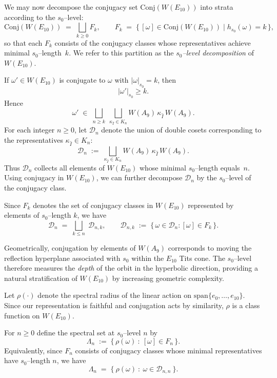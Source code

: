 \documentclass[11pt]{amsart}
\numberwithin{equation}{section}
\newcommand{\conW}{\mathrm{Conj}(W(E_{10}))}
\begin{document}
 \vspace{1ex}
We may now decompose the conjugacy set $\conW$ into strata according to
the $s_0$--level:
\[
\conW \;=\; \bigsqcup_{k\ge 0} F_k,
\qquad
F_k \;=\; \{\, [\omega] \in \conW \mid h_{s_0}(\omega)=k \,\},
\]
so that each $F_k$ consists of the conjugacy classes whose representatives
achieve minimal $s_0$--length~$k$.
We refer to this partition as the \emph{$s_0$--level decomposition} of
$W(E_{10})$.

\medskip
If $\omega'\in W(E_{10})$ is conjugate to $\omega$ with 
$|\omega|_{s_0}=k$, then
\[
|\omega'|_{s_0}\ge k.
\]
Hence
\[
\omega' \;\in\;
\bigsqcup_{n\ge k}\;
\bigsqcup_{\kappa_{\widehat I}\in K_n}
W(A_9)\,\kappa_{\widehat I}\,W(A_9).
\]
For each integer $n\ge0$, let $\mathcal{D}_n$ denote the union of
double cosets corresponding to the representatives
$\kappa_{\widehat I}\in K_n$:
\[
\mathcal{D}_n
\;:=\;
\bigsqcup_{\kappa_{\widehat I}\in K_n}
W(A_9)\,\kappa_{\widehat I}\,W(A_9).
\]
Thus $\mathcal{D}_n$ collects all elements of $W(E_{10})$
whose minimal $s_0$--length equals~$n$.
Using conjugacy in $W(E_{10})$, we can further decompose $\mathcal{D}_n$
by the $s_0$--level of the conjugacy class.

Since $F_k$ denotes the set of conjugacy classes in $W(E_{10})$
represented by elements of $s_0$--length $k$, we have
\begin{equation}\label{E:Dnn}
\mathcal{D}_n
\;=\;
\bigsqcup_{k\le n}\;
\mathcal{D}_{n,k},
\qquad
\mathcal{D}_{n,k}
\;:=\;
\{\,\omega\in\mathcal{D}_n : [\omega]\in F_k\,\}.
\end{equation}

\medskip
Geometrically, conjugation by elements of $W(A_9)$ corresponds to moving
the reflection hyperplane associated with $s_0$ within the $E_{10}$ Tits cone.
The $s_0$--level therefore measures the \emph{depth} of the orbit
in the hyperbolic direction, providing a natural stratification of
$W(E_{10})$ by increasing geometric complexity.

\medskip
Let $\rho(\cdot)$ denote the spectral radius of the linear action on
$\mathrm{span}\{e_0,\dots,e_{10}\}$.
Since our representation is faithful and conjugation acts by similarity,
$\rho$ is a class function on $W(E_{10})$.

For $n\ge0$ define the spectral set at $s_0$--level $n$ by
\[
\Lambda_n \;:=\; \{\, \rho(\omega)\ :\ [\omega]\in F_n \,\}.
\]
Equivalently, since $F_n$ consists of conjugacy classes whose minimal
representatives have $s_0$--length $n$, we have
\[
\Lambda_n \;=\; \{\ \rho(\omega)\ :\ \omega\in \mathcal{D}_{n,n}\ \}.
\]
\end{document}
